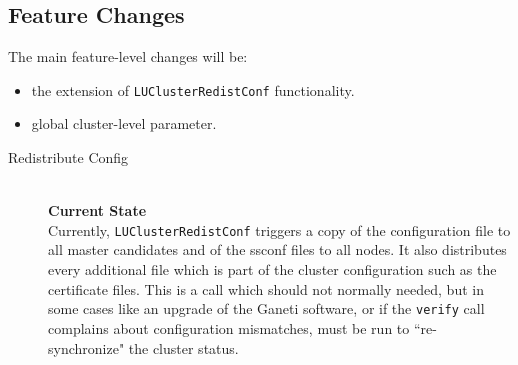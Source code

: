 \subsection{Feature Changes}

The main feature-level changes will be:

\begin{itemize}
  \item the extension of \texttt{LUClusterRedistConf} functionality.
  \item global cluster-level parameter.
\end{itemize}

\begin{description}
  \item[Redistribute Config] \hfill \\
    \textbf{Current State} \\
    Currently, \texttt{LUClusterRedistConf} triggers a copy of the configuration
    file to all master candidates and of the ssconf files to all nodes. It also
    distributes every additional file which is part of the cluster configuration
    such as the certificate files. This is a call which should not normally
    needed, but in some cases like an upgrade of the Ganeti software, or if the
    \texttt{verify} call complains about configuration mismatches, must be run to
    ``re-synchronize" the cluster status.


\end{description}
